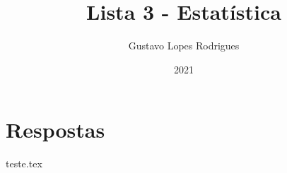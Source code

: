\documentclass[12pt]{article}
\title{\textbf{Lista 3 - Estatística}}
\author{Gustavo Lopes Rodrigues}
\date{2021}
\begin{document}
    
    \maketitle

    \section*{Respostas}

    {teste.tex}
\end{document}
